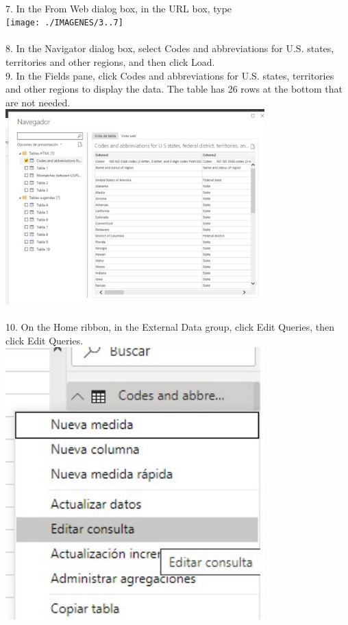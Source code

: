 \documentclass[preprint,12pt]{elsarticle}
\begin{document}
\begin{itemize}
		 		\\ 7. In the From Web dialog box, in the URL box, type
		 		\\ \texttt{[image: ./IMAGENES/3..7]} \\
		 		\\ 8. In the Navigator dialog box, select Codes and abbreviations for U.S. states, territories and other
		 		regions, and then click Load.
		 		\\ 9. In the Fields pane, click Codes and abbreviations for U.S. states, territories and other regions to
		 		display the data. The table has 26 rows at the bottom that are not needed.
		 		\\ \includegraphics[width=10cm]{./IMAGENES/3.9} \\
		 		\\ 10. On the Home ribbon, in the External Data group, click Edit Queries, then click Edit Queries.
		 		\\ \includegraphics[width=10cm]{./IMAGENES/3.10} \\

\end{itemize}
\end{document}
